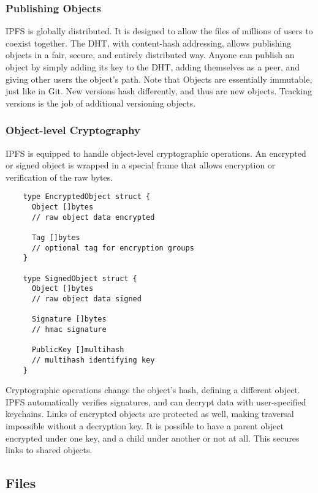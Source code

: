 \documentclass{sig-alternate}
\begin{document}
\subsubsection{Publishing Objects}

IPFS is globally distributed. It is designed to allow the files of millions of users to coexist together. The DHT, with content-hash addressing, allows publishing objects in a fair, secure, and entirely distributed way. Anyone can publish an object by simply adding its key to the DHT, adding themselves as a peer, and giving other users the object's path. Note that Objects are essentially immutable, just like in Git. New versions hash differently, and thus are new objects. Tracking versions is the job of additional versioning objects.

\subsubsection{Object-level Cryptography}

IPFS is equipped to handle object-level cryptographic operations. An encrypted or signed object is wrapped in a special frame that allows encryption or verification of the raw bytes.

\begin{verbatim}
    type EncryptedObject struct {
      Object []bytes
      // raw object data encrypted

      Tag []bytes
      // optional tag for encryption groups
    }

    type SignedObject struct {
      Object []bytes
      // raw object data signed

      Signature []bytes
      // hmac signature

      PublicKey []multihash
      // multihash identifying key
    }
\end{verbatim}

Cryptographic operations change the object's hash, defining a different object. IPFS automatically verifies signatures, and can decrypt data with user-specified keychains. Links of encrypted objects are protected as well, making traversal impossible without a decryption key. It is possible to have a parent object encrypted under one key, and a child under another or not at all. This secures links to shared objects.


\subsection{Files}
\end{document}

